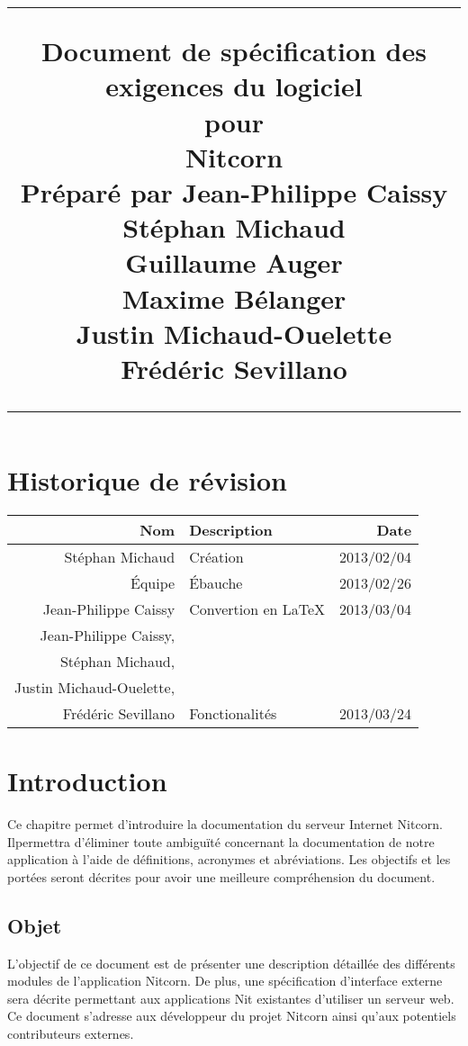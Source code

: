 \documentclass{scrreprt}
\title{%
\flushright
\rule{16cm}{5pt}\vskip1cm
\Huge{Document de spécification des exigences du logiciel}\\
\vspace{2cm}
pour\\
\vspace{2cm}
Nitcorn\\
\vspace{2cm}
Préparé par Jean-Philippe Caissy\\Stéphan Michaud\\Guillaume Auger\\Maxime
Bélanger\\Justin Michaud-Ouelette\\Frédéric Sevillano\\
\vfill
\rule{16cm}{5pt}
}
\date{}
\begin{document}
\maketitle
\tableofcontents
\chapter*{Historique de révision}
\begin{tabularx}{\textwidth}{|r|X|r|}
    \hline
    Nom & Description & Date \\
    \hline
    Stéphan Michaud & Création & 2013/02/04 \\
    \hline
    Équipe & Ébauche & 2013/02/26 \\
    \hline
    Jean-Philippe Caissy & Convertion en \LaTeX & 2013/03/04 \\
    \hline
    Jean-Philippe Caissy,\\Stéphan Michaud,\\Justin Michaud-Ouelette,\\Frédéric Sevillano & Fonctionalités & 2013/03/24 \\
    \hline
\end{tabularx}

\chapter{Introduction}
Ce chapitre permet d'introduire la documentation du serveur Internet Nitcorn. Ilpermettra d'éliminer toute ambiguïté concernant la documentation
de notre application à l'aide de définitions, acronymes et
abréviations. Les objectifs et les portées seront décrites pour
avoir une meilleure compréhension du document.
\section{Objet}
L'objectif de ce document est de présenter une description
détaillée des différents modules de l'application Nitcorn. De plus,
une spécification d'interface externe sera décrite permettant aux applications
Nit existantes
d'utiliser un serveur web.\\
Ce document s'adresse aux développeur du projet Nitcorn ainsi qu'aux potentiels
contributeurs externes.
\end{document}
